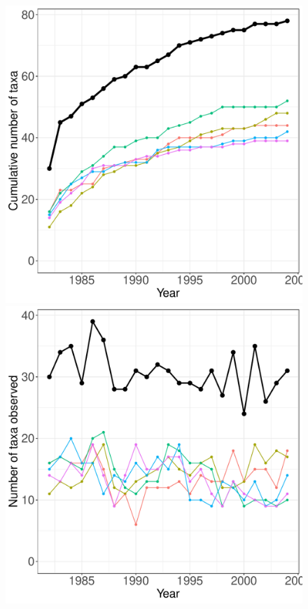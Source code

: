 \documentclass[11pt, oneside]{article}
\begin{document}
\begin{figure}[h!]
\centering
\includegraphics[scale = 0.4]{cdr-plantsD-compagnoni_species_accumulation_curve.pdf}
\includegraphics[scale = 0.4]{cdr-plantsD-compagnoni_num_taxa_over_time.pdf}

\end{figure}
\end{document}
